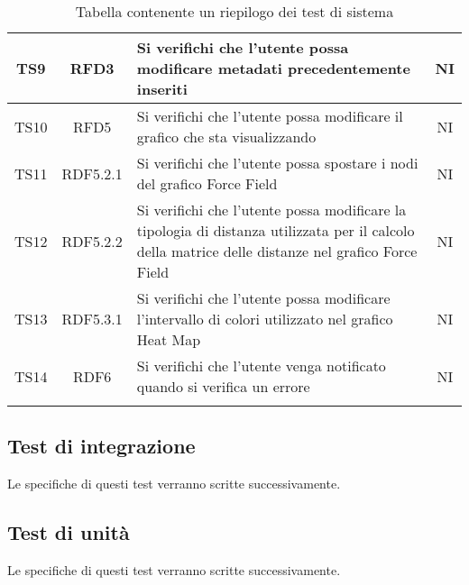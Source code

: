 \documentclass[../piano_di_qualifica.tex]{subfiles}
\begin{document}
\begin{center}
\begin{longtable}{|c|c|p{8.5cm}|c|}
		TS9                              & RFD3                   & Si verifichi che l'utente possa modificare metadati precedentemente inseriti                                      & NI                         \\ \hline
		TS10                             & RFD5                   & Si verifichi che l'utente possa modificare il grafico che sta visualizzando                                       & NI                         \\ \hline
		TS11                             & RDF5.2.1               & Si verifichi che l'utente possa spostare i nodi del grafico Force Field                                           & NI                         \\ \hline
		TS12                             & RDF5.2.2               & Si verifichi che l'utente possa modificare la tipologia di distanza utilizzata per il calcolo della matrice delle
		distanze nel grafico Force Field & NI                                                                                                                                                                      \\ \hline
		TS13                             & RDF5.3.1               & Si verifichi che l'utente possa modificare l'intervallo di colori utilizzato nel grafico Heat Map                 & NI                         \\ \hline
		TS14                             & RDF6                   & Si verifichi che l'utente venga notificato quando si verifica un errore                                           & NI                         \\
		\hline
		\rowcolor{white}
		\caption{Tabella contenente un riepilogo dei test di sistema}
	\end{longtable}

\end{center}


\subsection{Test di integrazione}%
\label{sub:test_int}
Le specifiche di questi test verranno scritte successivamente.

\subsection{Test di unità}%
\label{sub:test_unit}
Le specifiche di questi test verranno scritte successivamente.
\end{document}
